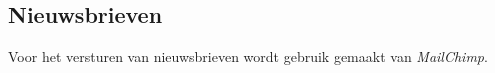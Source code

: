 \subsection{Nieuwsbrieven}\label{nieuwsbrieven}

Voor het versturen van nieuwsbrieven wordt gebruik gemaakt van \emph{MailChimp}.

